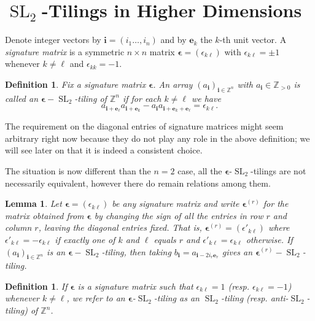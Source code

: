 \documentclass[11pt,reqno]{amsart}
\newtheorem{definition}[theorem]{Definition}
\newtheorem{lemma}[theorem]{Lemma}
\newcommand{\bepsilon}{\boldsymbol{\epsilon}}
\newcommand{\be}{\boldsymbol{e}}
\newcommand{\bi}{\boldsymbol{i}}
\newcommand{\SL}{\operatorname{SL}}
\newcommand{\ZZ}{\mathbb{Z}}
\begin{document}
\section{$\SL_2$-Tilings in Higher Dimensions}
  Denote integer vectors by $\bi=(i_1\dots,i_n)$ and by $\be_k$ the $k$-th unit vector.
  A \emph{signature matrix} is a symmetric $n\times n$ matrix $\bepsilon=(\epsilon_{k\ell})$ with $\epsilon_{k\ell}=\pm 1$ whenever $k\neq \ell$ and $\epsilon_{kk}=-1$. 
  \begin{definition}
    Fix a signature matrix $\bepsilon$.  
    An array $(a_{\bi})_{\bi\in\ZZ^n}$ with $a_{\bi}\in\ZZ_{>0}$ is called an \emph{$\bepsilon-\SL_2$-tiling of $\ZZ^n$} if for each $k \neq\ell$ we have
    \begin{equation}\label{eq:higher sl2 recursion}
      a_{\bi+\be_\ell}a_{\bi+\be_k}-a_{\bi}a_{\bi+\be_k+\be_\ell}=\epsilon_{k\ell}.
    \end{equation}
  \end{definition}
  The requirement on the diagonal entries of signature matrices might seem arbitrary right now because they do not play any role in the above definition; we will see later on that it is indeed a consistent choice.
  
  The situation is now different than the $n=2$ case, all the $\bepsilon$-$\SL_2$-tilings are not necessarily equivalent, however there do remain relations among them.
  \begin{lemma}\label{le:flip}
    Let $\bepsilon=(\epsilon_{k\ell})$ be any signature matrix and write $\bepsilon^{(r)}$ for the matrix obtained from $\bepsilon$ by changing the sign of all the entries in row $r$ and column $r$, leaving the diagonal entries fixed. 
    That is, $\bepsilon^{(r)} =(\epsilon'_{k\ell})$ where $\epsilon'_{k\ell}=-\epsilon_{k\ell}$ if exactly one of $k$ and $\ell$ equals $r$ and $\epsilon'_{k\ell}=\epsilon_{k\ell}$ otherwise. 
    If $(a_{\bi})_{\bi\in\ZZ^n}$ is an $\bepsilon-\SL_2$-tiling, then taking $b_{\bi}=a_{\bi-2i_r\be_r}$ gives an $\bepsilon^{(r)}-\SL_2$-tiling.
  \end{lemma}

  \begin{definition}
    If $\bepsilon$ is a signature matrix such that $\epsilon_{k\ell}=1$ (resp. $\epsilon_{k\ell}=-1$) whenever $k\neq\ell$,
    we refer to an $\bepsilon$-$\SL_2$-tiling as an \emph{$\SL_2$-tiling} (resp. \emph{anti-$\SL_2$-tiling}) of $\ZZ^n$.
  \end{definition}
\end{document}
